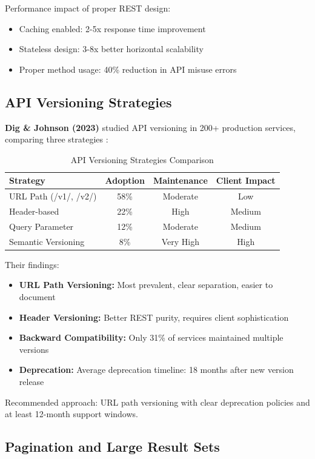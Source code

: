 \documentclass[conference]{IEEEtran}
\begin{document}
Performance impact of proper REST design:
\begin{itemize}
    \item Caching enabled: 2-5x response time improvement
    \item Stateless design: 3-8x better horizontal scalability
    \item Proper method usage: 40\% reduction in API misuse errors
\end{itemize}

\subsection{API Versioning Strategies}

\textbf{Dig \& Johnson (2023)} studied API versioning in 200+ production services, comparing three strategies \cite{dig2023versioning}:

\begin{table}[h]
\centering
\caption{API Versioning Strategies Comparison}
\begin{tabular}{|l|c|c|c|}
\hline
\textbf{Strategy} & \textbf{Adoption} & \textbf{Maintenance} & \textbf{Client Impact} \\
\hline
URL Path (/v1/, /v2/) & 58\% & Moderate & Low \\
Header-based & 22\% & High & Medium \\
Query Parameter & 12\% & Moderate & Medium \\
Semantic Versioning & 8\% & Very High & High \\
\hline
\end{tabular}
\end{table}

Their findings:
\begin{itemize}
    \item \textbf{URL Path Versioning:} Most prevalent, clear separation, easier to document
    \item \textbf{Header Versioning:} Better REST purity, requires client sophistication
    \item \textbf{Backward Compatibility:} Only 31\% of services maintained multiple versions
    \item \textbf{Deprecation:} Average deprecation timeline: 18 months after new version release
\end{itemize}

Recommended approach: URL path versioning with clear deprecation policies and at least 12-month support windows.

\subsection{Pagination and Large Result Sets}
\end{document}

